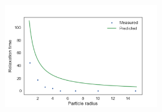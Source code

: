 \documentclass[11pt]{article}
\begin{document}
\begin{enumerate}
\begin{enumerate}
\begin{figure}[H]
    \centering
    \includegraphics[width=0.6\textwidth]{trel_r.png}
    \end{figure}

    \end{enumerate}

\end{enumerate}
\end{document}
